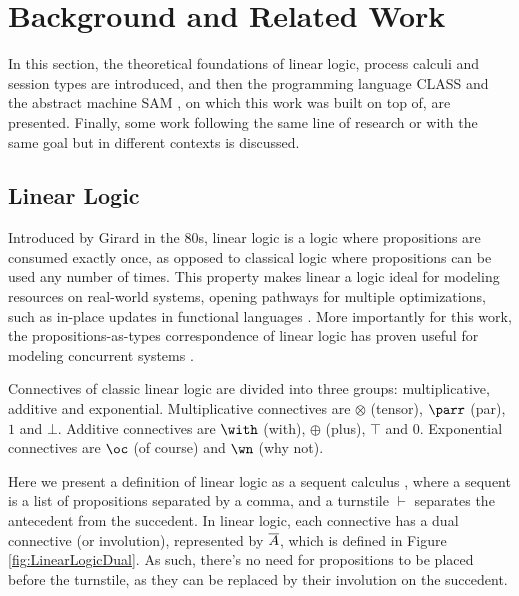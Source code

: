 
\section{Background and Related Work}

In this section, the theoretical foundations of linear logic, process calculi and session types are introduced, and then the programming language CLASS \cite{Rocha:2021} and the abstract machine SAM \cite{Caires:2024}, on which this work was built on top of, are presented. Finally, some work following the same line of research or with the same goal but in different contexts is discussed.

\subsection{Linear Logic}

Introduced by Girard \cite{Girard:1987} in the 80s, linear logic is a logic where propositions are consumed exactly once, as opposed to classical logic where propositions can be used any number of times. This property makes linear a logic ideal for modeling resources on real-world systems, opening pathways for multiple optimizations, such as in-place updates in functional languages \cite{Hofmann:2000}. More importantly for this work, the propositions-as-types correspondence of linear logic has proven useful for modeling concurrent systems \cite{Caires:2010}.

Connectives of classic linear logic are divided into three groups: multiplicative, additive and exponential. Multiplicative connectives are $\otimes$ (tensor), $\parr$ (par), $1$ and $\bot$. Additive connectives are $\with$ (with), $\oplus$ (plus), $\top$ and $0$. Exponential connectives are $\oc$ (of course) and $\wn$ (why not).

Here we present a definition of linear logic as a sequent calculus \cite{Abramsky:1993}, where a sequent is a list of propositions separated by a comma, and a turnstile $\vdash$ separates the antecedent from the succedent. In linear logic, each connective has a dual connective (or involution), represented by $\overline{A}$, which is defined in Figure \ref{fig:LinearLogicDual}. As such, there's no need for propositions to be placed before the turnstile, as they can be replaced by their involution on the succedent.

